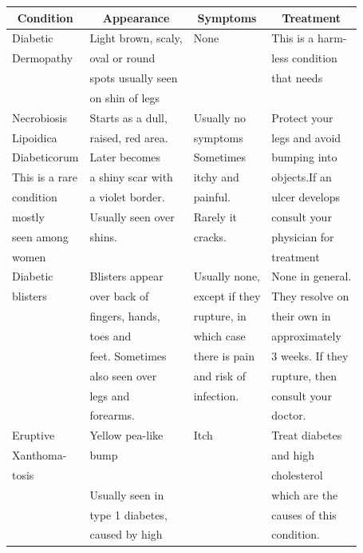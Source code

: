 {
\small\addtolength{\tabcolsep}{-.9pt}
\begin{longtable}{|l|l|l|l|}
\hline
\multicolumn{1}{|c|}{\textbf{{Condition}}} & \multicolumn{1}{|c|}{\textbf{Appearance}} & \multicolumn{1}{|c|}{\textbf{Symptoms}} & \multicolumn{1}{|c|}{\textbf{Treatment}}\\
\hline
Diabetic &  Light brown, scaly, & None & This is a harm-\\
Dermopathy & oval or round &  & less condition\\
 & spots usually seen &  & that needs\\
 & on shin of legs &  & \\
\hline
Necrobiosis & Starts as a dull, & Usually no & Protect your\\
Lipoidica & raised, red area. & symptoms & legs and avoid\\
Diabeticorum & Later becomes & Sometimes & bumping into\\
This is a rare & a shiny scar with & itchy and & objects.If an\\
condition & a violet border. & painful. & ulcer develops\\
mostly & Usually seen over & Rarely  it & consult your\\
seen among & shins. & cracks. & physician for\\
women &  &  & treatment\\
\hline
Diabetic & Blisters appear & Usually none, & None in general.\\
blisters & over back of & except if they & They resolve on\\
 & fingers, hands, & rupture, in & their own in\\
 & toes and & which case & approximately\\
 & feet. Sometimes & there is pain & 3 weeks. If they\\
 & also seen over & and risk of & rupture, then\\
 & legs and & infection. & consult your\\
 & forearms. &  & doctor.\\
\hline
Eruptive & Yellow pea-like & Itch & Treat diabetes\\
Xanthoma- & bump &  & and high\\
tosis  & & & cholesterol\\
\hline
 & Usually seen in &  & which are the\\
 & type 1 diabetes, &  & causes of this\\
 & caused by high &  & condition.\\

\end{longtable}}
